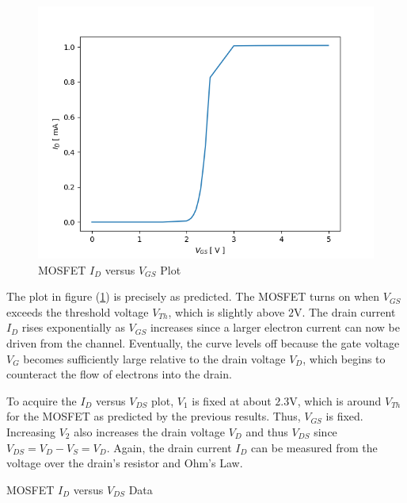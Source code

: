 \begin{figure}[h!]
	\centering
	\includegraphics[scale=0.75]{../images/mosfet_id_vgs.PNG}
	\caption{MOSFET $I_D$ versus $V_{GS}$ Plot}
	\label{fig:mosfet_id_vgs}
\end{figure}

\FloatBarrier

The plot in figure (\ref{fig:mosfet_id_vgs}) is precisely as predicted. The MOSFET turns on when $V_{GS}$ exceeds the threshold voltage $V_{Th}$, which is slightly above $2$\si{\volt}. The drain current $I_{D}$ rises exponentially as $V_{GS}$ increases since a larger electron current can now be driven from the channel. Eventually, the curve levels off because the gate voltage $V_{G}$ becomes sufficiently large relative to the drain voltage $V_{D}$, which begins to counteract the flow of electrons into the drain.

To acquire the $I_D$ versus $V_{DS}$ plot, $V_1$ is fixed at about $2.3$\si{\volt}, which is around $V_{Th}$ for the MOSFET as predicted by the previous results. Thus, $V_{GS}$ is fixed. Increasing $V_2$ also increases the drain voltage $V_{D}$ and thus $V_{DS}$ since $V_{DS} = V_D - V_S = V_D$. Again, the drain current $I_D$ can be measured from the voltage over the drain's resistor and Ohm's Law.

\FloatBarrier

\begin{table}[h!]
	\centering
	\caption{MOSFET $I_D$ versus $V_{DS}$ Data}
	\label{tab:mosfet_id_vds}
\end{table}

